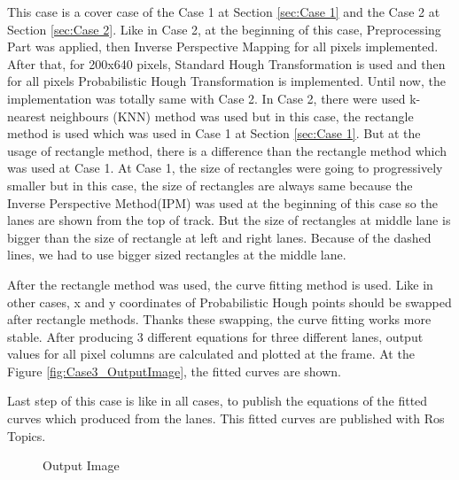 This case is a cover case of the Case 1 at Section \ref{sec:Case 1} and the Case 2 at Section \ref{sec:Case 2}. Like in Case 2, at the beginning of this case, Preprocessing Part was applied, then Inverse Perspective Mapping for all pixels implemented. After that, for 200x640 pixels, Standard Hough Transformation is used and then for all pixels Probabilistic Hough Transformation is implemented. Until now, the implementation was totally same with Case 2. In Case 2, there were used k-nearest neighbours (KNN) method was used but in this case, the rectangle method is used which was used in Case 1 at Section \ref{sec:Case 1}. But at the usage of rectangle method, there is a difference than the rectangle method which was used at Case 1. At Case 1, the size of rectangles were going to progressively smaller but in this case, the size of rectangles are always same because the Inverse Perspective Method(IPM) was used at the beginning of this case so the lanes are shown from the top of track. But the size of rectangles at middle lane is bigger than the size of rectangle at left and right lanes. Because of the dashed lines, we had to use bigger sized rectangles at the middle lane.

After the rectangle method was used,  the curve fitting method is used. Like in other cases, x and y coordinates of Probabilistic Hough points should be swapped after rectangle methods. Thanks these swapping, the curve fitting works more stable. After producing 3 different equations for three different lanes, output values for all pixel columns are calculated and plotted at the frame. At the Figure \ref{fig:Case3_OutputImage}, the fitted curves are shown.

Last step of this case is like in all cases, to publish the equations of the fitted curves which produced from the lanes. This fitted curves are published with Ros Topics.

\begin{figure}[H]
  \centering
  \caption{Output Image}
\end{figure}


